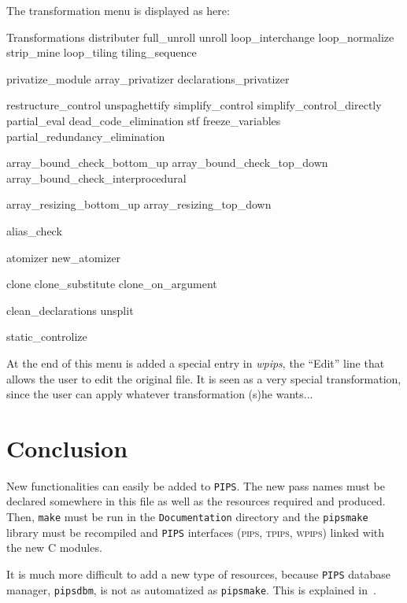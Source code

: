 \documentclass[a4paper]{report}
\newcommand{\Pips}{\texttt{PIPS}}
\newcommand{\Pipsmake}{\texttt{pipsmake}}
\newcommand{\WPIPS}{{\em wpips}}
\begin{document}
The transformation menu is displayed as here:
\begin{PipsMenu}{Transformations}
  distributer
  full_unroll
  unroll
  loop_interchange
  loop_normalize
  strip_mine
  loop_tiling
  tiling_sequence

  privatize_module
  array_privatizer
  declarations_privatizer

  restructure_control
  unspaghettify
  simplify_control
  simplify_control_directly
  partial_eval
  dead_code_elimination
  stf
  freeze_variables
  partial_redundancy_elimination

  array_bound_check_bottom_up
  array_bound_check_top_down
  array_bound_check_interprocedural

  array_resizing_bottom_up
  array_resizing_top_down

  alias_check

  atomizer
  new_atomizer

  clone
  clone_substitute
  clone_on_argument

  clean_declarations
  unsplit

  static_controlize
\end{PipsMenu}


At the end of this menu is added a special entry in \WPIPS, the ``Edit'' line
that allows the user to edit the original file. It is seen as a very
special transformation, since the user can apply whatever
transformation (s)he wants...







\chapter{Conclusion}

New functionalities can easily be added to \Pips{}. The new pass names
must be declared somewhere in this file as well as the resources required
and produced. Then, {\tt make} must be run in the {\tt Documentation}
directory and the \Pipsmake{} library must be recompiled and \Pips{}
interfaces (\textsc{pips}, \textsc{tpips}, \textsc{wpips}) linked with the
new C modules.

It is much more difficult to add a new type of resources, because \Pips{}
database manager, \texttt{pipsdbm}, is not as automatized as
\Pipsmake{}. This is explained in~\cite{Iri94}.
\end{document}
